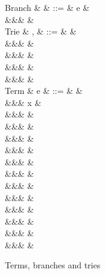 \begin{figure}
\begin{syntaxfig}
\mbox{Branch}
&
\kappa
&
::=
&
e
&
\\
&&&
\sigma
&
\\[2mm]
\mbox{Trie}
&
\sigma, \tau
&
::=
&
&
\\
&&&
\trieUnit{\kappa}
&
\\
&&&
\trieSum{\sigma}{\tau}
&
\\
&&&
\trieProd{\sigma}
&
\\
&&&
\trieRoll{\sigma}
&
\\[2mm]
\mbox{Term}
&
e
&
::=
&
&
\\
&&&
x
&
\\
&&&
\exUnit
&
\\
&&&
&
\\
&&&
&
\\
&&&
&
\\
&&&
&
\\
&&&
&
\\
&&&
&
\\
&&&
&
\\
&&&
\exFun{\sigma}
&
\\
&&&
&
\\
&&&
&
\\
&&&
&
\end{syntaxfig}
\caption{Terms, branches and tries}
\end{figure}
